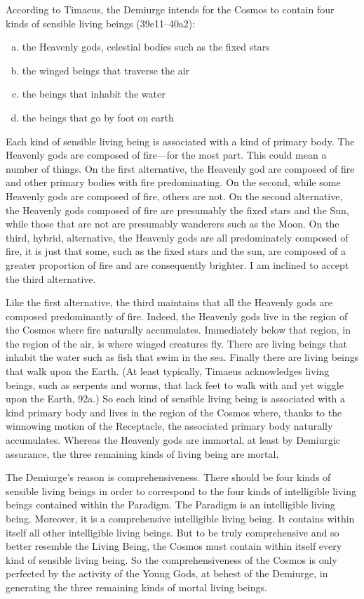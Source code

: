According to Timaeus, the Demiurge intends for the Cosmos to contain four kinds of sensible living beings (39e11--40a2):
\begin{enumerate}[(a)]
	\item the Heavenly gods, celestial bodies such as the fixed stars
	\item the winged beings that traverse the air
	\item the beings that inhabit the water
	\item the beings that go by foot on earth
\end{enumerate}
Each kind of sensible living being is associated with a kind of primary body. The Heavenly gods are composed of fire---for the most part. This could mean a number of things. On the first alternative, the Heavenly god are composed of fire and other primary bodies with fire predominating. On the second, while some Heavenly gods are composed of fire, others are not. On the second alternative, the Heavenly gods composed of fire are presumably the fixed stars and the Sun, while those that are not are presumably wanderers such as the Moon. On the third, hybrid, alternative, the Heavenly gods are all predominately composed of fire, it is just that some, such as the fixed stars and the sun, are composed of a greater proportion of fire and are consequently brighter. I am inclined to accept the third alternative. 

Like the first alternative, the third maintains that all the Heavenly gods are composed predominantly of fire. Indeed, the Heavenly gods live in the region of the Cosmos where fire naturally accumulates. Immediately below that region, in the region of the air, is where winged creatures fly. There are living beings that inhabit the water such as fish that swim in the sea. Finally there are living beings that walk upon the Earth. (At least typically, Timaeus acknowledges living beings, such as serpents and worms, that lack feet to walk with and yet wiggle upon the Earth, 92a.) So each kind of sensible living being is associated with a kind primary body and lives in the region of the Cosmos where, thanks to the winnowing motion of the Receptacle, the associated primary body naturally accumulates. Whereas the Heavenly gods are immortal, at least by Demiurgic assurance, the three remaining kinds of living being are mortal.

The Demiurge's reason is comprehensiveness. There should be four kinds of sensible living beings in order to correspond to the four kinds of intelligible living beings contained within the Paradigm. The Paradigm is an intelligible living being. Moreover, it is a comprehensive intelligible living being. It contains within itself all other intelligible living beings. But to be truly comprehensive and so better resemble the Living Being, the Cosmos must contain within itself every kind of sensible living being. So the comprehensiveness of the Cosmos is only perfected by the activity of the Young Gods, at behest of the Demiurge, in generating the three remaining kinds of mortal living beings.

